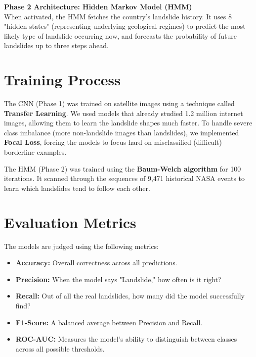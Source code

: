 \documentclass[12pt,a4paper]{article}
\begin{document}
\textbf{Phase 2 Architecture: Hidden Markov Model (HMM)}\\
When activated, the HMM fetches the country's landslide history. It uses 8 "hidden states" (representing underlying geological regimes) to predict the most likely type of landslide occurring now, and forecasts the probability of future landslides up to three steps ahead.

\section{Training Process}
The CNN (Phase 1) was trained on satellite images using a technique called \textbf{Transfer Learning}. We used models that already studied 1.2 million internet images, allowing them to learn the landslide shapes much faster. To handle severe class imbalance (more non-landslide images than landslides), we implemented \textbf{Focal Loss}, forcing the models to focus hard on misclassified (difficult) borderline examples.

The HMM (Phase 2) was trained using the \textbf{Baum-Welch algorithm} for 100 iterations. It scanned through the sequences of 9,471 historical NASA events to learn which landslides tend to follow each other.

\section{Evaluation Metrics}
The models are judged using the following metrics:
\begin{itemize}
    \item \textbf{Accuracy:} Overall correctness across all predictions.
    \item \textbf{Precision:} When the model says "Landslide," how often is it right?
    \item \textbf{Recall:} Out of all the real landslides, how many did the model successfully find?
    \item \textbf{F1-Score:} A balanced average between Precision and Recall.
    \item \textbf{ROC-AUC:} Measures the model's ability to distinguish between classes across all possible thresholds.
\end{itemize}
\end{document}
